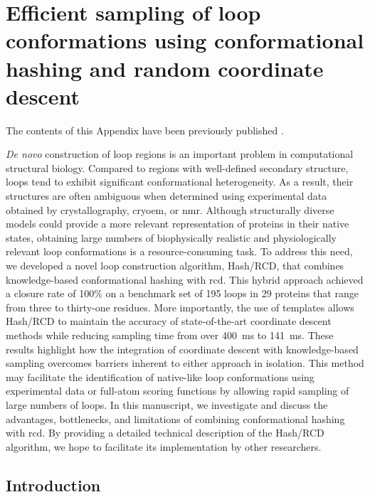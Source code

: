 \clearpage %

\chapter{Efficient sampling of loop conformations using conformational hashing and random coordinate descent} \label{app:loophash}

The contents of this Appendix have been previously published \citep*{DelAlamo2021}.

\bigskip

\emph{De novo} construction of loop regions is an important problem in computational structural biology. Compared to regions with well-defined secondary structure, loops tend to exhibit significant conformational heterogeneity. As a result, their structures are often ambiguous when determined using experimental data obtained by crystallography, \gls{cryoem}, or \gls{nmr}. Although structurally diverse models could provide a more relevant representation of proteins in their native states, obtaining large numbers of biophysically realistic and physiologically relevant loop conformations is a resource-consuming task. To address this need, we developed a novel loop construction algorithm, Hash/RCD, that combines knowledge-based conformational hashing with \gls{rcd}. This hybrid approach achieved a closure rate of 100\% on a benchmark set of 195 loops in 29 proteins that range from three to thirty-one residues. More importantly, the use of templates allows Hash/RCD to maintain the accuracy of state-of-the-art coordinate descent methods while reducing sampling time from over \SI{400}{ms} to \SI{141}{ms}. These results highlight how the integration of coordinate descent with knowledge-based sampling overcomes barriers inherent to either approach in isolation. This method may facilitate the identification of native-like loop conformations using experimental data or full-atom scoring functions by allowing rapid sampling of large numbers of loops. In this manuscript, we investigate and discuss the advantages, bottlenecks, and limitations of combining conformational hashing with \gls{rcd}. By providing a detailed technical description of the Hash/RCD algorithm, we hope to facilitate its implementation by other researchers.

\section{Introduction}\label{sec:loophash_intro}

